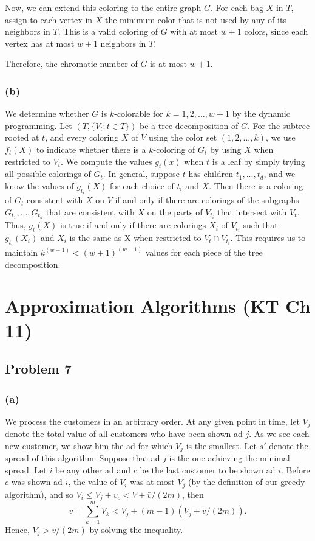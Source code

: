 \documentclass[12pt,onecolumn,a4paper]{article}
\begin{document}
Now, we can extend this coloring to the entire graph $G$. For each bag $X$ in $T$, assign to each vertex in $X$ the minimum color that is not used by any of its neighbors in $T$. This is a valid coloring of $G$ with at most $w + 1$ colors, since each vertex has at most $w + 1$ neighbors in $T$.

Therefore, the chromatic number of $G$ is at most $w + 1$.

\subsubsection*{(b)}
We determine whether $G$ is $k$-colorable for $k=1,2,\dots,w+1$ by the dynamic programming. Let $(T, \{V_t: t\in T\})$ be a tree decomposition of $G$. 
For the subtree rooted at $t$, and every coloring $X$ of $V$ using the color set $(1,2,..., k)$, we use $f_t(X)$ to indicate whether there is a $k$-coloring of $G_t$ by using $X$ when restricted to $V_t$. 
We compute the values $g_t(x)$ when $t$ is a leaf by simply trying all possible colorings of $G_t$. In general, suppose $t$ has children $t_1,...,t_d$, and we know the values of $g_{t_i}(X)$ for each choice of $t_i$ and $X$. Then there is a coloring of $G_t$ consistent with $X$ on $V$ if and only if there are colorings of the subgraphs $G_{t_1},..., G_{t_d}$ that are consistent with $X$ on the parts of $V_{t_i}$ that intersect with $V_t$. Thus, $g_t(X)$ is true if and only if there are colorings $X_i$ of $V_{t_i}$ such that $g_{t_i}(X_i)$ and $X_i$ is the same as X when restricted to $V_t\cap V_{t_i}$.
This requires us to maintain $k^{(w+1)} < (w + 1)^{(w+1)}$ values for each piece of the tree decomposition.
\section*{Approximation Algorithms (KT Ch 11)}
\subsection*{Problem 7}
\subsubsection*{(a)} 
We process the customers in an arbitrary order. At any given point in time, let $V_j$ denote the total value of all customers who have been shown ad $j$. As we see each new customer, we show him the ad for which $V_j$ is the smallest.
Let $s'$ denote the spread of this algorithm. 
Suppose that ad $j$ is the one achieving the minimal spread. Let $i$ be any other ad and $c$ be the last customer to be shown ad $i$. Before $c$ was shown ad $i$, the value of $V_i$ was at most $V_j$ (by the definition of our greedy algorithm), and so $V_i \le V_j + v_c < V + \bar{v}/(2m)$, then
$$\bar{v} = \sum_{k=1}^{m} V_k < V_j + (m-1)(V_j + \bar{v}/(2m)).$$
Hence, $V_j > \bar{v}/(2m)$ by solving the inequality.
\end{document}
